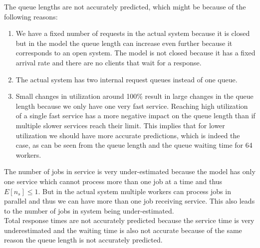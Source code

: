 The queue lengths are not accurately predicted, which might be because of the following reasons:
\begin{enumerate}
\item We have a fixed number of requests in the actual system because it is closed but in the model the queue length can increase even further because it corresponds to an open system. The model is not closed because it has a fixed arrival rate and there are no clients that wait for a response.
\item The actual system has two internal request queues instead of one queue.
\item Small changes in utilization around 100\% result in large changes in the queue length because we only have one very fast service. Reaching high utilization of a single fast service has a more negative impact on the queue length than if multiple slower services reach their limit. This implies that for lower utilization we should have more accurate predictions, which is indeed the case, as can be seen from the queue length and the queue waiting time for 64 workers. 
\end{enumerate}
The number of jobs in service is very under-estimated because the model has only one service which cannot process more than one job at a time and thus $E[n_s] \leq 1$. But in the actual system multiple workers can process jobs in parallel and thus we can have more than one job receiving service. This also leads to the number of jobs in system being under-estimated. \\
Total response times are not accurately predicted because the service time is very underestimated and the waiting time is also not accurate because of the same reason the queue length is not accurately predicted. 

